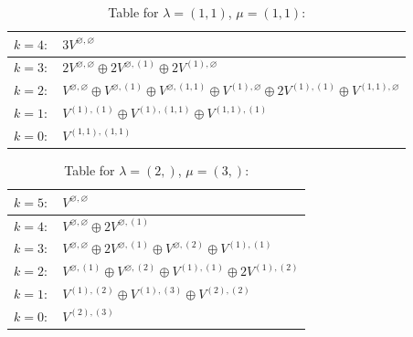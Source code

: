 \renewcommand{\arraystretch}{1.6} 
\begin{table}[H]
\centering
\caption{Table for $\lambda = (1, 1)$, $\mu = (1, 1)$:}
\begin{tabular}{|>{\centering\arraybackslash}p{15cm}|}
\hline
 $k = 4: \quad 3 V^{\varnothing, \varnothing} $ \\ \hline
 $k = 3: \quad 2 V^{\varnothing, \varnothing} \oplus 2 V^{\varnothing, (1)} \oplus 2 V^{(1), \varnothing} $ \\ \hline
 $k = 2: \quad V^{\varnothing, \varnothing} \oplus V^{\varnothing, (1)} \oplus V^{\varnothing, (1, 1)} \oplus V^{(1), \varnothing} \oplus 2 V^{(1), (1)} \oplus V^{(1, 1), \varnothing} $ \\ \hline
 $k = 1: \quad V^{(1), (1)} \oplus V^{(1), (1, 1)} \oplus V^{(1, 1), (1)} $ \\ \hline
 $k = 0: \quad V^{(1, 1), (1, 1)} $ \\ \hline
\end{tabular}
\end{table}

\renewcommand{\arraystretch}{1.6} 
\begin{table}[H]
\centering
\caption{Table for $\lambda = (2,)$, $\mu = (3,)$:}
\begin{tabular}{|>{\centering\arraybackslash}p{15cm}|}
\hline
 $k = 5: \quad V^{\varnothing, \varnothing} $ \\ \hline
 $k = 4: \quad V^{\varnothing, \varnothing} \oplus 2 V^{\varnothing, (1)} $ \\ \hline
 $k = 3: \quad V^{\varnothing, \varnothing} \oplus 2 V^{\varnothing, (1)} \oplus V^{\varnothing, (2)} \oplus V^{(1), (1)} $ \\ \hline
 $k = 2: \quad V^{\varnothing, (1)} \oplus V^{\varnothing, (2)} \oplus V^{(1), (1)} \oplus 2 V^{(1), (2)} $ \\ \hline
 $k = 1: \quad V^{(1), (2)} \oplus V^{(1), (3)} \oplus V^{(2), (2)} $ \\ \hline
 $k = 0: \quad V^{(2), (3)} $ \\ \hline
\end{tabular}
\end{table}

